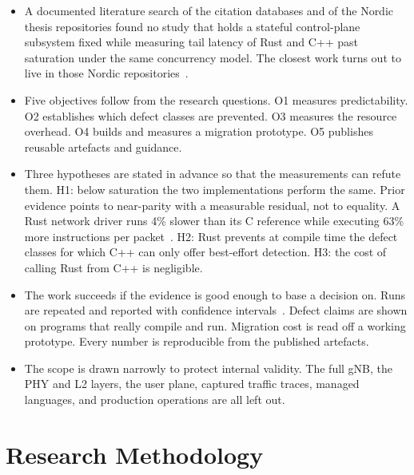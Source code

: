 \documentclass[english,twoside,openright,a4paper,censored,csm,software-track-2020]{HYthesisML}
\begin{document}
\begin{itemize}
  \item A documented literature search of the citation databases and of the Nordic thesis
        repositories found no study that holds a stateful control-plane subsystem fixed while
        measuring tail latency of Rust and C++ past saturation under the same concurrency model.
        The closest work turns out to live in those Nordic
        repositories~\cite{karlback2021ran,arvidsson2025async,emberg2023asn1}.
  \item Five objectives follow from the research questions. O1 measures predictability. O2
        establishes which defect classes are prevented. O3 measures the resource overhead. O4
        builds and measures a migration prototype. O5 publishes reusable artefacts and guidance.
  \item Three hypotheses are stated in advance so that the measurements can refute them. H1:
        below saturation the two implementations perform the same. Prior evidence points to
        near-parity with a measurable residual, not to equality. A Rust network driver runs
        4\% slower than its C reference while executing 63\% more instructions per
        packet~\cite{emmerich2019drivers}. H2: Rust prevents at compile time the defect classes
        for which C++ can only offer best-effort detection. H3: the cost of calling Rust from
        C++ is negligible.
  \item The work succeeds if the evidence is good enough to base a decision on. Runs are
        repeated and reported with confidence intervals~\cite{georges2007rigorous}. Defect claims
        are shown on programs that really compile and run. Migration cost is read off a working
        prototype. Every number is reproducible from the published artefacts.
  \item The scope is drawn narrowly to protect internal validity. The full gNB, the PHY and L2
        layers, the user plane, captured traffic traces, managed languages, and production
        operations are all left out.
\end{itemize}

\chapter{Research Methodology\label{chapter:methodology}}
\end{document}

